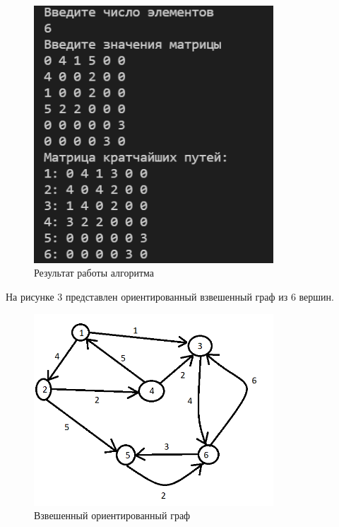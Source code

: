 \documentclass[bachelor, och, labwork]{shiza}
\begin{document}
  \begin{figure}[H]
    \centering
    \includegraphics[width=0.8\textwidth]{img/2_2}
    \caption{Результат работы алгоритма}
  \end{figure}

  На рисунке 3 представлен ориентированный взвешенный граф из 6 вершин.


  \begin{figure}[H]
    \centering
    \includegraphics[width=0.8\textwidth]{img/2_3}
    \caption{Взвешенный ориентированный граф}
  \end{figure}
  
\end{document}
